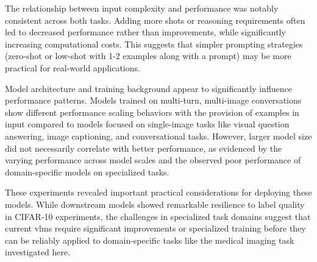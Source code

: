\documentclass[../ShajiS_RnDReport.tex]{subfiles}
\begin{document}
The relationship between input complexity and performance was notably consistent across both tasks. Adding more shots or reasoning requirements often led to decreased performance rather than improvements, while significantly increasing computational costs. This suggests that simpler prompting strategies (zero-shot or low-shot with 1-2 examples along with a prompt) may be more practical for real-world applications.

Model architecture and training background appear to significantly influence performance patterns. Models trained on multi-turn, multi-image conversations show different performance scaling behaviors with the provision of examples in input compared to models focused on single-image tasks like visual question answering, image captioning, and conversational tasks. However, larger model size did not necessarily correlate with better performance, as evidenced by the varying performance across model scales and the observed poor performance of domain-specific models on specialized tasks.

These experiments revealed important practical considerations for deploying these models. While downstream models showed remarkable resilience to label quality in CIFAR-10 experiments, the challenges in specialized task domains suggest that current \glspl{vlm} require significant improvements or specialized training before they can be reliably applied to domain-specific tasks like the medical imaging task investigated here.
\end{document}
